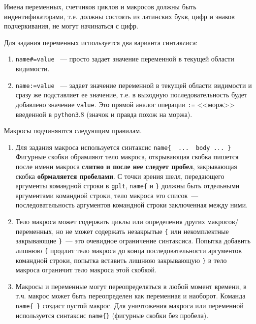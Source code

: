 \documentclass[12pt]{article}
\def\gplt{{\tt gplt}}
\def\python{{\tt python3}}
\begin{document}
Имена переменных, счетчиков циклов и макросов должны быть индентификаторами,
т.е. должны состоять из латинских букв, цифр и знаков подчеркивания, не могут начинаться с цифр.

Для задания переменных используется два варианта синтакcиса:
\begin{enumerate}
\item \verb'name#=value' ~--- просто задает значение переменной в текущей области видимости.
\item \verb'name:=value' ~--- задает значение переменной в текущей области видимости и сразу же подставляет ее значение, т.е. в выходную
  поcледовательность будет добавлено значение \verb'value'. Это прямой аналог операции \verb':=' <<морж>> введенной в \python.8  (значок и правда похож на моржа).
\end{enumerate}

Макросы подчиняются следующим правилам.
\begin{enumerate}
\item  Для задания макроса используется синтаксис
\verb'name{  ...  body ... }'
Фигурные скобки обрамляют тело макроса, открывающая скобка пишется после имени макроса {\bf слитно  и после нее следует пробел},
закрывающая скобка {\bf обрмаляется пробелами}. С точки зрения шелл, передающего аргументы командной строки в \gplt, \verb'name{'
  и \verb'}' должны быть отдельными аргументами командной строки, тело макроса это список~--- последовательность аргументов командной строки заключенная между ними.
\item Тело макроса может содержать циклы или определения других макросов/переменных, но не может содержать незакрытые \verb'{' или некомплектные закрывающие \verb'}'~---
это очевидное ограничение синтаксиса. Попытка добавить лишнюю \verb'{' продлит тело макроса до конца последовательности аргументов командной строки,
попытка вставить лишнюю закрывающую \verb'}' в тело макроса ограничит тело макроса этой скобкой. 
\item Макросы и переменные могут переопределяться в любой момент времени, в т.ч. макрос может быть переопределен как переменная и наоборот.
Команда \verb'name{ }' создаст пустой макрос.  Для уничтожения макроса или переменной используется синтаксис \verb'name{}' (фигурные скобки без пробела).
\end{enumerate}
\end{document}
